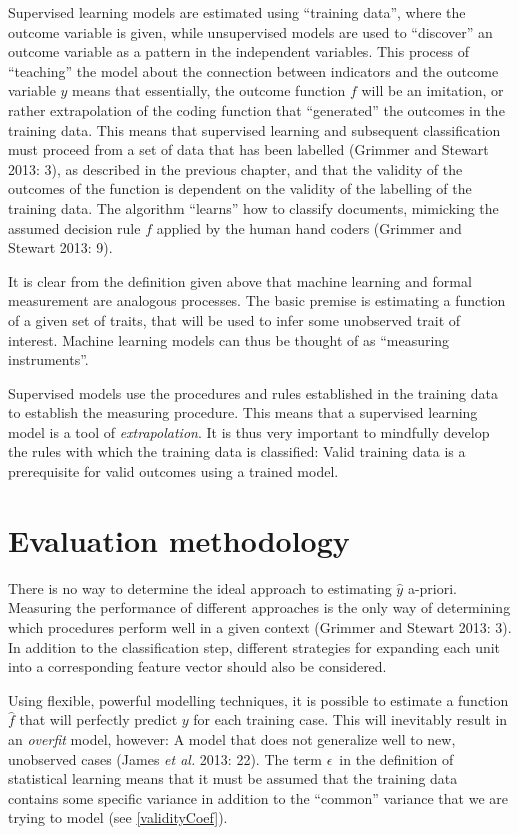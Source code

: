 \documentclass[12pt,twoside]{reedthesis}
\begin{document}
Supervised learning models are estimated using ``training data'', where
the outcome variable is given, while unsupervised models are used to
``discover'' an outcome variable as a pattern in the independent
variables. This process of ``teaching'' the model about the connection
between indicators and the outcome variable \(y\) means that
essentially, the outcome function \(f\) will be an imitation, or rather
extrapolation of the coding function that ``generated'' the outcomes in
the training data. This means that supervised learning and subsequent
classification must proceed from a set of data that has been labelled
(Grimmer and Stewart 2013: 3), as described in the previous chapter, and
that the validity of the outcomes of the function is dependent on the
validity of the labelling of the training data. The algorithm ``learns''
how to classify documents, mimicking the assumed decision rule \(f\)
applied by the human hand coders (Grimmer and Stewart 2013: 9).

It is clear from the definition given above that machine learning and
formal measurement are analogous processes. The basic premise is
estimating a function of a given set of traits, that will be used to
infer some unobserved trait of interest. Machine learning models can
thus be thought of as ``measuring instruments''.

Supervised models use the procedures and rules established in the
training data to establish the measuring procedure. This means that a
supervised learning model is a tool of \emph{extrapolation}. It is thus
very important to mindfully develop the rules with which the training
data is classified: Valid training data is a prerequisite for valid
outcomes using a trained model.

\section{Evaluation methodology}\label{evaluation-methodology}

There is no way to determine the ideal approach to estimating
\(\hat{y}\) a-priori. Measuring the performance of different approaches
is the only way of determining which procedures perform well in a given
context (Grimmer and Stewart 2013: 3). In addition to the classification
step, different strategies for expanding each unit into a corresponding
feature vector should also be considered.

Using flexible, powerful modelling techniques, it is possible to
estimate a function \(\hat{f}\) that will perfectly predict \(y\) for
each training case. This will inevitably result in an \emph{overfit}
model, however: A model that does not generalize well to new, unobserved
cases (James \emph{et al.} 2013: 22). The term \(\epsilon\)~in the
definition of statistical learning means that it must be assumed that
the training data contains some specific variance in addition to the
``common'' variance that we are trying to model (see
\ref{validityCoef}).
\end{document}
